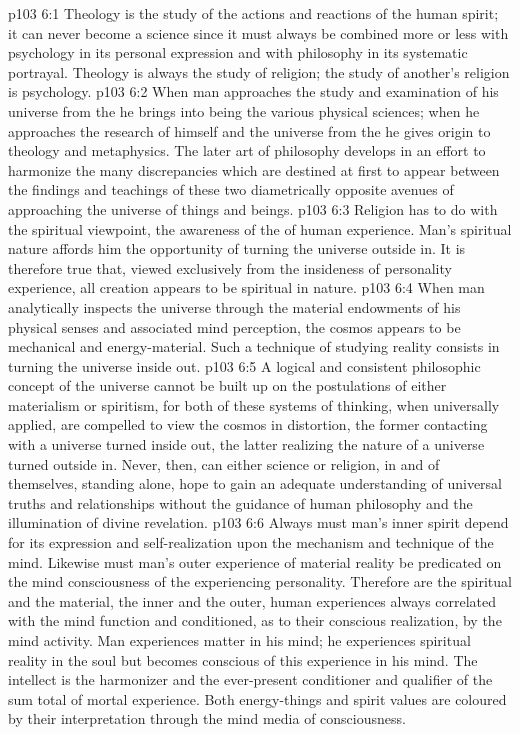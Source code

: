 \vs p103 6:1 Theology is the study of the actions and reactions of the human spirit; it can never become a science since it must always be combined more or less with psychology in its personal expression and with philosophy in its systematic portrayal. Theology is always the study of  religion; the study of another’s religion is psychology.
\vs p103 6:2 \pc When man approaches the study and examination of his universe from the  he brings into being the various physical sciences; when he approaches the research of himself and the universe from the  he gives origin to theology and metaphysics. The later art of philosophy develops in an effort to harmonize the many discrepancies which are destined at first to appear between the findings and teachings of these two diametrically opposite avenues of approaching the universe of things and beings.
\vs p103 6:3 Religion has to do with the spiritual viewpoint, the awareness of the  of human experience. Man’s spiritual nature affords him the opportunity of turning the universe outside in. It is therefore true that, viewed exclusively from the insideness of personality experience, all creation appears to be spiritual in nature.
\vs p103 6:4 When man analytically inspects the universe through the material endowments of his physical senses and associated mind perception, the cosmos appears to be mechanical and energy\hyp{}material. Such a technique of studying reality consists in turning the universe inside out.
\vs p103 6:5 \pc A logical and consistent philosophic concept of the universe cannot be built up on the postulations of either materialism or spiritism, for both of these systems of thinking, when universally applied, are compelled to view the cosmos in distortion, the former contacting with a universe turned inside out, the latter realizing the nature of a universe turned outside in. Never, then, can either science or religion, in and of themselves, standing alone, hope to gain an adequate understanding of universal truths and relationships without the guidance of human philosophy and the illumination of divine revelation.
\vs p103 6:6 Always must man’s inner spirit depend for its expression and self\hyp{}realization upon the mechanism and technique of the mind. Likewise must man’s outer experience of material reality be predicated on the mind consciousness of the experiencing personality. Therefore are the spiritual and the material, the inner and the outer, human experiences always correlated with the mind function and conditioned, as to their conscious realization, by the mind activity. Man experiences matter in his mind; he experiences spiritual reality in the soul but becomes conscious of this experience in his mind. The intellect is the harmonizer and the ever\hyp{}present conditioner and qualifier of the sum total of mortal experience. Both energy\hyp{}things and spirit values are coloured by their interpretation through the mind media of consciousness.
